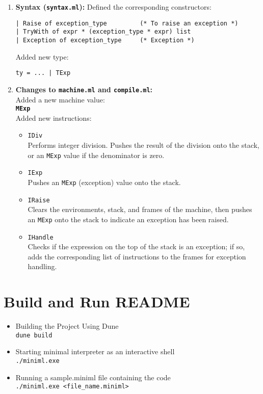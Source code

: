 \documentclass[a4paper,12pt]{article}
\begin{document}
\begin{enumerate}[left=0.5cm]
    \item \textbf{Syntax (\texttt{syntax.ml}):}  
    Defined the corresponding constructors:
\begin{lstlisting}
| Raise of exception_type         (* To raise an exception *)
| TryWith of expr * (exception_type * expr) list
| Exception of exception_type     (* Exception *)
\end{lstlisting}
    Added new type:
\begin{lstlisting}
ty = ... | TExp
\end{lstlisting}
    \item \textbf{Changes to \texttt{machine.ml} and \texttt{compile.ml}:}\\
    Added a new machine value:\\
    \textbf{\texttt{MExp}}\\
    Added new instructions:
    \begin{itemize}[left=0.2cm]
        \item \texttt{IDiv} \\
        Performs integer division. Pushes the result of the division onto the stack, or an \texttt{MExp} value if the denominator is zero.
        \item \texttt{IExp} \\
        Pushes an \texttt{MExp} (exception) value onto the stack.
        \item \texttt{IRaise} \\
        Clears the environments, stack, and frames of the machine, then pushes an \texttt{MExp} onto the stack to indicate an exception has been raised.
        \item \texttt{IHandle} \\
        Checks if the expression on the top of the stack is an exception; if so, adds the corresponding list of instructions to the frames for exception handling.
    \end{itemize}
    \end{enumerate}

\section{Build and Run README}
\begin{itemize}[left=0.2cm]
        \item Building the Project Using Dune \\
        \texttt{dune build} \\
        \item Starting minimal interpreter as an interactive shell\\
        \texttt{./miniml.exe}\\
        \item Running a sample.miniml file containing the code \\
        \texttt{./miniml.exe <file\_name.miniml>}
    \end{itemize}
\end{document}
